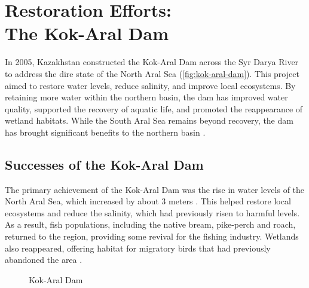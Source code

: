 

\chapter[Restoration Efforts: The Kok-Aral Dam]{Restoration Efforts:\\The Kok-Aral Dam}
\label{cp:restoration}

\vspace{.935em}

In 2005, Kazakhstan constructed the Kok-Aral Dam across the Syr Darya River to address the dire state of the North Aral Sea (\autoref{fig:kok-aral-dam}). This project aimed to restore water levels, reduce salinity, and improve local ecosystems.  By retaining more water within the northern basin, the dam has improved water quality, supported the recovery of aquatic life, and promoted the reappearance of wetland habitats. While the South Aral Sea remains beyond recovery, the dam has brought significant benefits to the northern basin \autocite{chen2018kazakhstan}.

\section{Successes of the Kok-Aral Dam}
The primary achievement of the Kok-Aral Dam was the rise in water levels of the North Aral Sea, which increased by about 3 meters \autocite{chen2018kazakhstan}. This helped restore local ecosystems and reduce the salinity, which had previously risen to harmful levels. As a result, fish populations, including the native bream, pike-perch and roach, returned to the region, providing some revival for the fishing industry. Wetlands also reappeared, offering habitat for migratory birds that had previously abandoned the area \autocite{chen2018aral}.

\begin{figure}[htpb]
    \centering
    \caption{Kok-Aral Dam}
    \label{fig:kok-aral-dam}
\end{figure}

